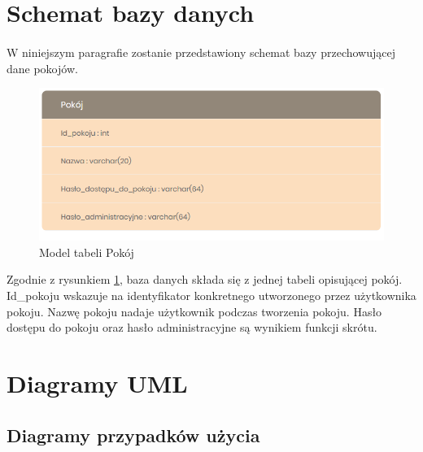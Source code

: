 \documentclass{article}
\begin{document}
	\section{Schemat bazy danych} 
	\paragraph{} W niniejszym paragrafie zostanie przedstawiony schemat bazy przechowującej dane pokojów.
	\begin{figure}[h]
		\centering
		\includegraphics[scale=0.7]{BD}
		\caption[]{Model tabeli Pokój}
		\label{fig:BD}
	\end{figure}

	Zgodnie z rysunkiem \ref{fig:BD}, baza danych składa się z jednej tabeli opisującej pokój. Id\_pokoju wskazuje na identyfikator konkretnego utworzonego przez użytkownika pokoju. Nazwę pokoju nadaje użytkownik podczas tworzenia pokoju. Hasło dostępu do pokoju oraz hasło administracyjne są wynikiem funkcji skrótu. 
	\section{Diagramy UML}
	\subsection{Diagramy przypadków użycia}
\end{document}
